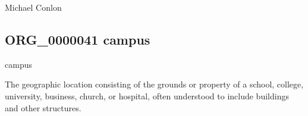 \documentclass[letterpaper,10pt,english]{sphinxmanual}
\begin{document}
\begin{sphinxShadowBox}

\sphinxAtStartPar
Michael Conlon 
\end{sphinxShadowBox}

\begin{sphinxShadowBox}

\sphinxAtStartPar
{}
\end{sphinxShadowBox}
\begin{quote}

\ignorespaces \end{quote}


\subsection{ORG\_0000041 \sphinxhyphen{} campus}
\label{\detokenize{doc-ORG_0000041:org-0000041-campus}}\label{\detokenize{doc-ORG_0000041:index-0}}\label{\detokenize{doc-ORG_0000041::doc}}
\begin{sphinxShadowBox}

\sphinxAtStartPar
campus
\end{sphinxShadowBox}

\begin{sphinxShadowBox}

\sphinxAtStartPar
{\hyperref[\detokenize{doc-ORG_0000040::doc}]{}}
\end{sphinxShadowBox}

\begin{sphinxShadowBox}

\sphinxAtStartPar
The geographic location consisting of the  grounds or property of a school, college, university, business, church, or hospital, often understood to include buildings and other structures.
\end{sphinxShadowBox}

\begin{sphinxShadowBox}

\sphinxAtStartPar
{}
\end{sphinxShadowBox}
\end{document}
